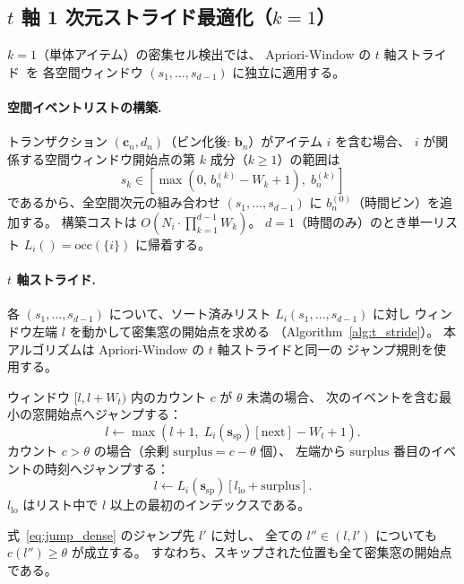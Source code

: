 \subsection{$t$ 軸 1 次元ストライド最適化（$k = 1$）}\label{sec:t_stride}

$k = 1$（単体アイテム）の密集セル検出では、
Apriori-Window の $t$ 軸ストライド~\cite{aprioriwindow}を
各空間ウィンドウ $(s_1, \ldots, s_{d-1})$ に独立に適用する。

\paragraph{空間イベントリストの構築.}
トランザクション $(\bm{c}_n, d_n)$（ビン化後: $\bm{b}_n$）がアイテム $i$ を含む場合、
$i$ が関係する空間ウィンドウ開始点の第 $k$ 成分（$k \geq 1$）の範囲は
\[
  s_k \in [\max(0,\, b_n^{(k)} - W_k + 1),\; b_n^{(k)}]
\]
であるから、全空間次元の組み合わせ $(s_1, \ldots, s_{d-1})$ に
$b_n^{(0)}$（時間ビン）を追加する。
構築コストは $O\!\left(N_i \cdot \prod_{k=1}^{d-1} W_k\right)$。
$d = 1$（時間のみ）のとき単一リスト $L_i() = \mathrm{occ}(\{i\})$ に帰着する。

\paragraph{$t$ 軸ストライド.}
各 $(s_1, \ldots, s_{d-1})$ について、ソート済みリスト $L_i(s_1, \ldots, s_{d-1})$ に対し
ウィンドウ左端 $l$ を動かして密集窓の開始点を求める
（Algorithm~\ref{alg:t_stride}）。
本アルゴリズムは Apriori-Window の $t$ 軸ストライドと同一の
ジャンプ規則を使用する。

ウィンドウ $[l, l+W_t)$ 内のカウント $c$ が $\theta$ 未満の場合、
次のイベントを含む最小の窓開始点へジャンプする：
\begin{equation}\label{eq:jump_empty}
  l \leftarrow \max(l+1,\; L_i(\bm{s}_{\mathrm{sp}})[\mathrm{next}] - W_t + 1).
\end{equation}
カウント $c > \theta$ の場合（余剰 $\mathrm{surplus} = c - \theta$ 個）、
左端から $\mathrm{surplus}$ 番目のイベントの時刻へジャンプする：
\begin{equation}\label{eq:jump_dense}
  l \leftarrow L_i(\bm{s}_{\mathrm{sp}})[l_{\mathrm{lo}} + \mathrm{surplus}].
\end{equation}
$l_{\mathrm{lo}}$ はリスト中で $l$ 以上の最初のインデックスである。

\begin{lemma}[ストライドの正確性]\label{lem:stride}
式~\eqref{eq:jump_dense} のジャンプ先 $l'$ に対し、
全ての $l'' \in (l, l')$ についても $c(l'') \geq \theta$ が成立する。
すなわち、スキップされた位置も全て密集窓の開始点である。
\end{lemma}

